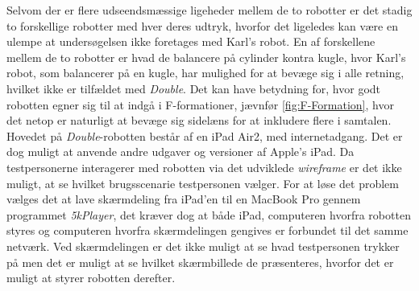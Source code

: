 Selvom der er flere udseendsmæssige ligeheder mellem de to robotter er det stadig to forskellige robotter med hver deres udtryk, hvorfor det ligeledes kan være en ulempe at undersøgelsen ikke foretages med Karl's robot. En af forskellene mellem de to robotter er hvad de balancere på cylinder kontra kugle, hvor Karl's robot, som balancerer på en kugle, har mulighed for at bevæge sig i alle retning, hvilket ikke er tilfældet med \textit{Double}. Det kan have betydning for, hvor godt robotten egner sig til at indgå i F-formationer, jævnfør \autoref{fig:F-Formation}, hvor det netop er naturligt at bevæge sig sidelæns for at inkludere flere i samtalen.\blankline
%
Hovedet på \textit{Double}-robotten består af en iPad Air2, med internetadgang. Det er dog muligt at anvende andre udgaver og versioner af Apple's iPad. Da testpersonerne interagerer med robotten via det udviklede \textit{wireframe} er det ikke muligt, at se hvilket brugsscenarie testpersonen vælger. For at løse det problem vælges det at lave skærmdeling fra iPad'en til en MacBook Pro gennem programmet \textit{5kPlayer}, det kræver dog at både iPad, computeren hvorfra robotten styres og computeren hvorfra skærmdelingen gengives er forbundet til det samme netværk. Ved skærmdelingen er det ikke muligt at se hvad testpersonen trykker på men det er muligt at se hvilket skærmbillede de præsenteres, hvorfor det er muligt at styrer robotten derefter. 

